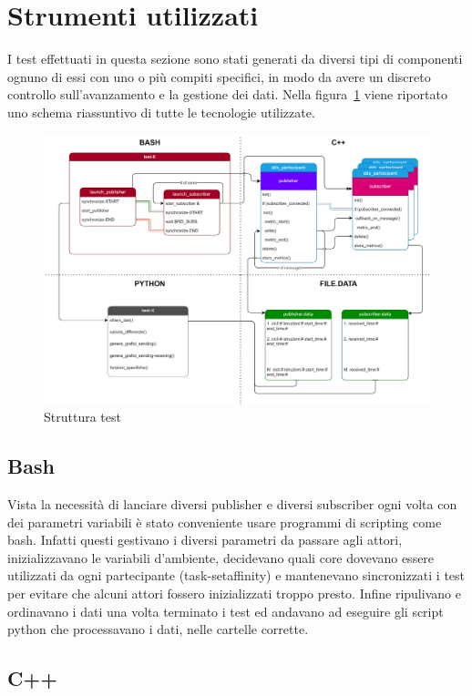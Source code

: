 \section{Strumenti utilizzati}%
I test effettuati in questa sezione sono stati generati da diversi tipi di componenti ognuno di essi con uno o più compiti specifici, in modo da avere un discreto controllo sull'avanzamento e la gestione dei dati. Nella figura~\ref{fig:schema_global} viene riportato uno schema riassuntivo di tutte le tecnologie utilizzate.
\begin{figure}[H]
    \centering
    \includegraphics[width=\textwidth]{./img/schema_test_globale.drawio.png}
    \caption{Struttura test}\label{fig:schema_global}
\end{figure}

\subsection{Bash}\label{sec:Shell}
Vista la necessità di lanciare diversi publisher e diversi subscriber ogni volta con dei parametri variabili è stato conveniente usare programmi di scripting come bash. Infatti questi gestivano i diversi parametri da passare agli attori, inizializzavano le variabili d'ambiente, decidevano quali core dovevano essere utilizzati da ogni partecipante (task-setaffinity) e mantenevano sincronizzati i test per evitare che alcuni attori fossero inizializzati troppo presto. Infine ripulivano e ordinavano i dati una volta terminato i test ed andavano ad eseguire gli script python che processavano i dati, nelle cartelle corrette.
\subsection{C++}

